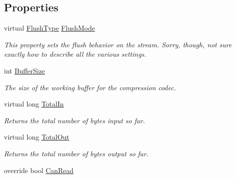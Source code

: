 \subsection*{Properties}
\begin{DoxyCompactItemize}
\item 
virtual \mbox{\hyperlink{namespace_super_tiled2_unity_1_1_ionic_1_1_zlib_a2c5853fd63f03c83ac2458da1f4ff3bc}{Flush\+Type}} \mbox{\hyperlink{class_super_tiled2_unity_1_1_ionic_1_1_zlib_1_1_zlib_stream_a79356b0cfbf9481948b23d8a2b19d032}{Flush\+Mode}}
\begin{DoxyCompactList}\small\item\em This property sets the flush behavior on the stream. Sorry, though, not sure exactly how to describe all the various settings. \end{DoxyCompactList}\item 
int \mbox{\hyperlink{class_super_tiled2_unity_1_1_ionic_1_1_zlib_1_1_zlib_stream_a581e057f7fb9012f56cbc3fd7ab8b226}{Buffer\+Size}}
\begin{DoxyCompactList}\small\item\em The size of the working buffer for the compression codec. \end{DoxyCompactList}\item 
virtual long \mbox{\hyperlink{class_super_tiled2_unity_1_1_ionic_1_1_zlib_1_1_zlib_stream_a7860988e77b1d7abe2d6989c0daf3b4b}{Total\+In}}
\begin{DoxyCompactList}\small\item\em Returns the total number of bytes input so far.\end{DoxyCompactList}\item 
virtual long \mbox{\hyperlink{class_super_tiled2_unity_1_1_ionic_1_1_zlib_1_1_zlib_stream_a3f844530eadd82f11009317b8dfc5aa2}{Total\+Out}}
\begin{DoxyCompactList}\small\item\em Returns the total number of bytes output so far.\end{DoxyCompactList}\item 
override bool \mbox{\hyperlink{class_super_tiled2_unity_1_1_ionic_1_1_zlib_1_1_zlib_stream_a6f6d2c1aa75d86e886417b6e2b7266a2}{Can\+Read}}

\end{DoxyCompactItemize}
